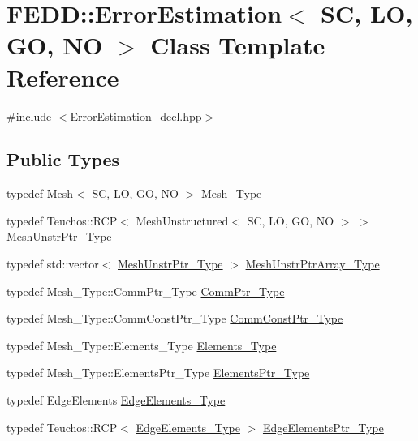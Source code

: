 \hypertarget{classFEDD_1_1ErrorEstimation}{}\section{F\+E\+DD\+:\+:Error\+Estimation$<$ SC, LO, GO, NO $>$ Class Template Reference}
\label{classFEDD_1_1ErrorEstimation}


{\ttfamily \#include $<$Error\+Estimation\+\_\+decl.\+hpp$>$}

\subsection*{Public Types}
\begin{DoxyCompactItemize}
\item 
typedef Mesh$<$ SC, LO, GO, NO $>$ \hyperlink{classFEDD_1_1ErrorEstimation_a6e55e8a488e7f9db2325d530dfacada5}{Mesh\+\_\+\+Type}
\item 
typedef Teuchos\+::\+R\+CP$<$ Mesh\+Unstructured$<$ SC, LO, GO, NO $>$ $>$ \hyperlink{classFEDD_1_1ErrorEstimation_a862043dc355a1524640b5ef53e8eefa1}{Mesh\+Unstr\+Ptr\+\_\+\+Type}
\item 
typedef std\+::vector$<$ \hyperlink{classFEDD_1_1ErrorEstimation_a862043dc355a1524640b5ef53e8eefa1}{Mesh\+Unstr\+Ptr\+\_\+\+Type} $>$ \hyperlink{classFEDD_1_1ErrorEstimation_ad64dcc59dd00c37ff85f641e52644916}{Mesh\+Unstr\+Ptr\+Array\+\_\+\+Type}
\item 
typedef Mesh\+\_\+\+Type\+::\+Comm\+Ptr\+\_\+\+Type \hyperlink{classFEDD_1_1ErrorEstimation_ac5689e70e0c965f5373f2a716c0250c1}{Comm\+Ptr\+\_\+\+Type}
\item 
typedef Mesh\+\_\+\+Type\+::\+Comm\+Const\+Ptr\+\_\+\+Type \hyperlink{classFEDD_1_1ErrorEstimation_a23c88f794d901561ef57840b68c0aa20}{Comm\+Const\+Ptr\+\_\+\+Type}
\item 
typedef Mesh\+\_\+\+Type\+::\+Elements\+\_\+\+Type \hyperlink{classFEDD_1_1ErrorEstimation_ac074c6f1011aead7c9b786ab33b23978}{Elements\+\_\+\+Type}
\item 
typedef Mesh\+\_\+\+Type\+::\+Elements\+Ptr\+\_\+\+Type \hyperlink{classFEDD_1_1ErrorEstimation_ae8e03ce6215a8a139c1c8e9d662030ce}{Elements\+Ptr\+\_\+\+Type}
\item 
typedef Edge\+Elements \hyperlink{classFEDD_1_1ErrorEstimation_a8014e1e4844351d77d667159034e7523}{Edge\+Elements\+\_\+\+Type}
\item 
typedef Teuchos\+::\+R\+CP$<$ \hyperlink{classFEDD_1_1ErrorEstimation_a8014e1e4844351d77d667159034e7523}{Edge\+Elements\+\_\+\+Type} $>$ \hyperlink{classFEDD_1_1ErrorEstimation_ac7ab89f64446e4c6e739058240497f04}{Edge\+Elements\+Ptr\+\_\+\+Type}

\end{DoxyCompactItemize}
